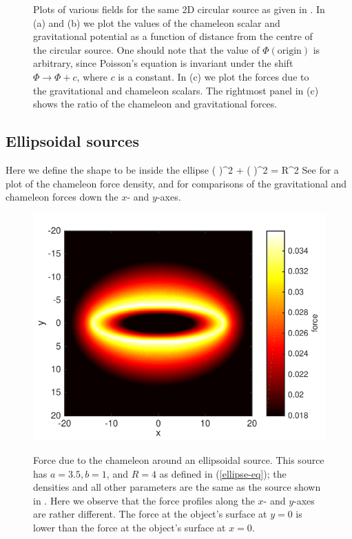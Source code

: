 \documentclass[a4paper, 12pt]{article}
\numberwithin{equation}{section}
\begin{document}
\begin{figure}[!t]
\begin{center}
      \end{center}
\caption{ Plots of various fields for the same 2D circular source as given in . In (a) and (b) we plot the values of the chameleon scalar and gravitational potential as a function of distance from the centre of the circular source. One should note that the value of $\Phi(\mbox{origin})$ is arbitrary, since Poisson's equation is invariant under the shift $\Phi \rightarrow \Phi + c$, where $c$ is a constant. In (c) we plot the forces due to the gravitational and chameleon scalars. The rightmost panel in (c) shows the ratio of the chameleon and gravitational forces. }\label{fig:circ-1dplots}
\end{figure}

\subsection{Ellipsoidal sources}
Here we define the shape to be inside the ellipse
\bea
\label{ellipse-eq}
\left( \right)^2 + \left( \right)^2 = R^2
\eea
See  for a plot of the chameleon force density, and  for comparisons of the gravitational and chameleon forces down the $x$- and $y$-axes.

\begin{figure}[!t]
      \begin{center}
{\includegraphics[scale=0.8,angle=0]{images/el_force_final}}
      \end{center}
\caption{ Force due to the chameleon around an ellipsoidal source. This source  has $a = 3.5, b = 1$, and $R=4$ as defined in (\ref{ellipse-eq}); the densities and all other parameters are the same as the source shown in . Here we observe that the force profiles along the $x$- and $y$-axes are rather different. The force at the object's surface at $y=0$ is lower than the force at the object's surface at $x=0$.  }\label{fig:ellip}
\end{figure}
\end{document}
